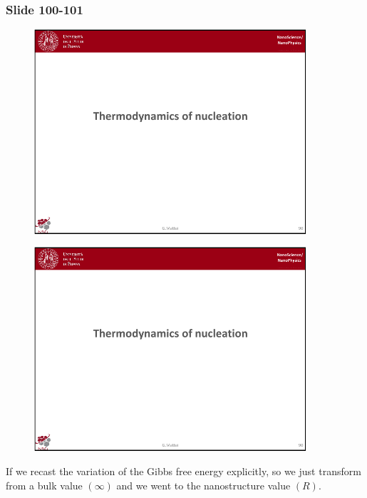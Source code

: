 \documentclass[../main/main.tex]{subfiles}
\begin{document}
\newpage
\subsubsection{Slide 100-101}

\begin{figure}[h!]
\centering
\includegraphics[page=11,width=0.9\textwidth]{../lessons/pdf_file/6_lesson.pdf}
\end{figure}

\begin{figure}[h!]
\centering
\includegraphics[page=12,width=0.9\textwidth]{../lessons/pdf_file/6_lesson.pdf}
\end{figure}


If we recast the variation of the Gibbs free energy explicitly, so we just transform from a bulk value \( (\infty) \) and we went to the nanostructure value \( (R) \).
\end{document}
